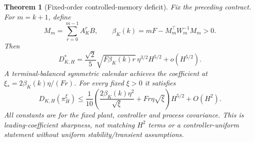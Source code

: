 \documentclass[11pt]{article}
\newtheorem{theorem}{Theorem}
\begin{document}
\begin{theorem}[Fixed-order controlled-memory deficit]\label{thm:main}
Fix the preceding contract. For $m=k+1$, define
\[
M_m=\sum_{r=0}^{m-1}A_K^rB,\qquad
\beta_K(k)=mF-M_m^\top W_m^{-1}M_m>0.
\]
Then
\begin{equation}\label{eq:sharp}
D_{K,H}^*=\frac{\sqrt2}{5}\sqrt{F\beta_K(k)r}\,\eta^{3/2}H^{5/2}
+o(H^{5/2}).
\end{equation}
A terminal-balanced symmetric calendar achieves the coefficient at
$\xi_*=2\beta_K(k)\eta/(Fr)$. For every fixed $\xi>0$ it satisfies
\begin{equation}\label{eq:upper}
D_{K,H}(\pi_H^\xi)\le\frac1{10}
\left(\frac{2\beta_K(k)\eta^2}{\sqrt\xi}+Fr\eta\sqrt\xi\right)H^{5/2}
+O(H^2).
\end{equation}
All constants are for the fixed plant, controller and process covariance.
This is leading-coefficient sharpness, not matching $H^2$ terms or a
controller-uniform statement without uniform stability/transient assumptions.
\end{theorem}
\end{document}
